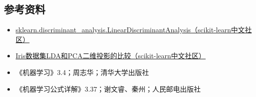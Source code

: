 \documentclass{ctexart}
\begin{document}
	\subsection{参考资料}
	\begin{itemize}
		\item \href{https://scikit-learn.org.cn/view/618.html}{sklearn.discriminant\_analysis.LinearDiscriminantAnalysis（scikit-learn中文社区）}
		\item\href{http://scikit-learn.org.cn/view/152.html}{Iris数据集LDA和PCA二维投影的比较（scikit-learn中文社区）}
		\item 《机器学习》3.4；周志华；清华大学出版社
		\item 《机器学习公式详解》3.37；谢文睿、秦州；人民邮电出版社
	\end{itemize}
\end{document}
